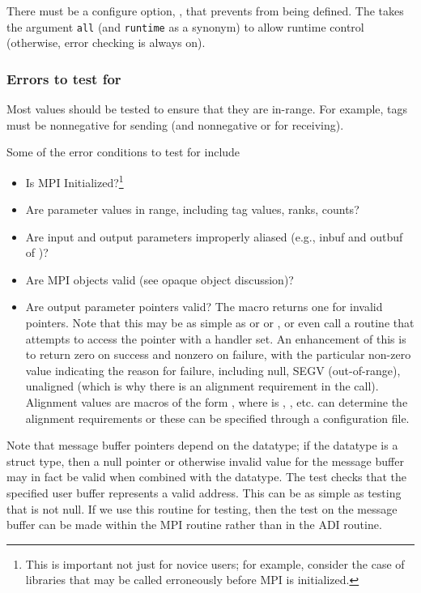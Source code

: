 \documentclass{article}
\begin{document}
There must be a configure option,
,  
that prevents  from being defined.  The
takes the argument \texttt{all} (and \texttt{runtime} as a synonym) to allow
runtime control (otherwise, error checking is always on).

\subsubsection{Errors to test for}
Most values should be tested to ensure that they are in-range.  For example,
tags must be nonnegative for sending (and nonnegative or
 for receiving). 

Some of the error conditions to test for include
\begin{itemize}
\item Is MPI Initialized?\footnote{This is important not just for
novice users; for example, consider the case of libraries that may be
called erroneously before MPI is initialized.}
\item Are parameter values in range, including tag values, ranks, counts?
\item Are input and output parameters improperly aliased (e.g., inbuf and
  outbuf of   )?
\item Are MPI objects valid (see opaque object discussion)?
\item Are output parameter pointers valid?  The macro
   returns one for
invalid pointers. 
  Note that this may be as simple as  or
   or , or
  even call a routine that attempts to access the pointer with a
   handler set.  An enhancement of this is to return
zero on success and nonzero on failure, with the particular non-zero
value indicating the reason for failure, including null, SEGV
(out-of-range), unaligned (which is why there is an alignment
requirement in the call). Alignment values are macros of the form
, where  is , ,
etc.   can determine the alignment requirements or
these can be specified through a configuration file.
\end{itemize}
Note that message buffer pointers depend on the datatype; if the datatype is a
struct type, then a null pointer or otherwise invalid value for the message
buffer may in fact be valid when combined with the datatype.
The test  checks that the
specified user buffer represents a valid address.  This can be as simple as
testing that  is not null.  If we
use 
this routine for testing, then the test on the message buffer can be made
within the MPI routine rather than in the ADI routine.
\end{document}
